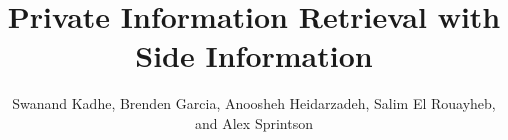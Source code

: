 \documentclass[letterpaper, 10 pt, conference]{ieeeconf}
\title{\LARGE \bf
Private Information Retrieval with Side Information}
\begin{document}




% 
\author{Swanand Kadhe, Brenden Garcia, Anoosheh Heidarzadeh, Salim El Rouayheb,  and
 Alex Sprintson}









\maketitle
\end{document}
